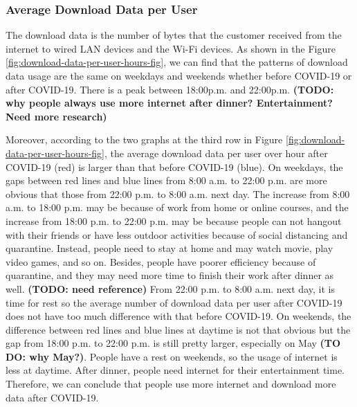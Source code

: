 \documentclass[conference,10pt]{IEEEtran}
\begin{document}
\subsubsection{Average Download Data per User}
\label{sec:download-data-per-user-over-hours}

The download data is the number of bytes that the customer received from the internet to wired LAN devices and the Wi-Fi devices. As shown in the Figure \ref{fig:download-data-per-user-hours-fig}, we can find that the patterns of download data usage are the same on weekdays and weekends whether before COVID-19 or after COVID-19. There is a peak between 18:00p.m. and 22:00p.m. \textbf{(TODO: why people always use more internet after dinner? Entertainment? Need more research)}

Moreover, according to the two graphs at the third row in Figure \ref{fig:download-data-per-user-hours-fig}, the average download data per user over hour after COVID-19 (red) is larger than that before COVID-19 (blue). On weekdays, the gaps between red lines and blue lines from 8:00 a.m. to 22:00 p.m. are more obvious that those from 22:00 p.m. to 8:00 a.m. next day. The increase from 8:00 a.m. to 18:00 p.m. may be because of work from home or online courses, and the increase from 18:00 p.m. to 22:00 p.m. may be because people can not hangout with their friends or have less outdoor activities because of social distancing and quarantine. Instead, people need to stay at home and may watch movie, play video games, and so on. Besides, people have poorer efficiency because of quarantine, and they may need more time to finish their work after dinner as well. \textbf{(TODO: need reference)} From 22:00 p.m. to 8:00 a.m. next day, it is time for rest so the average number of download data per user after COVID-19 does not have too much difference with that before COVID-19. On weekends, the difference between red lines and blue lines at daytime is not that obvious but the gap from 18:00 p.m. to 22:00 p.m. is still pretty larger, especially on May \textbf{(TO DO: why May?)}. People have a rest on weekends, so the usage of internet is less at daytime. After dinner, people need internet for their entertainment time. Therefore, we can conclude that people use more internet and download more data after COVID-19.
\end{document}
